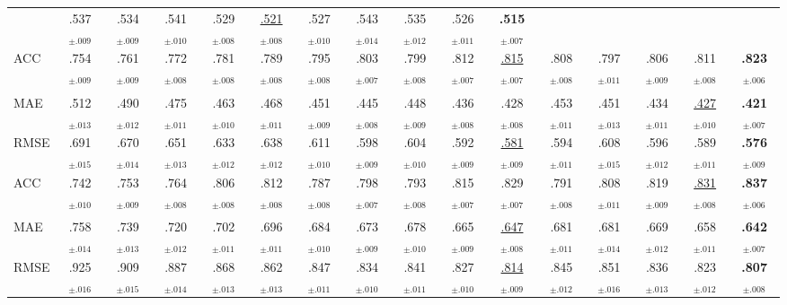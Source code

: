 \documentclass[10pt]{article}
\theoremstyle{plain}
\theoremstyle{definition}
\begin{document}
\begin{table}[ht!]
{\begin{tabular}{lccccc|cccccc|ccc|c}
     & .537$_{\pm.009}$ & .534$_{\pm.009}$ & .541$_{\pm.010}$ & .529$_{\pm.008}$ & \underline{.521}$_{\pm.008}$ & .527$_{\pm.010}$
     & .543$_{\pm.014}$ & .535$_{\pm.012}$ & .526$_{\pm.011}$ & \textbf{.515}$_{\pm.007}$ \\
ACC  & .754$_{\pm.009}$ & .761$_{\pm.009}$ & .772$_{\pm.008}$ & .781$_{\pm.008}$ & .789$_{\pm.008}$
     & .795$_{\pm.008}$ & .803$_{\pm.007}$ & .799$_{\pm.008}$ & .812$_{\pm.007}$ & \underline{.815}$_{\pm.007}$ & .808$_{\pm.008}$
     & .797$_{\pm.011}$ & .806$_{\pm.009}$ & .811$_{\pm.008}$ & \textbf{.823}$_{\pm.006}$ \\
\midrule
\rowcolor{gray!8}\multicolumn{16}{l}{\textbf{DBLP}} \\
MAE  & .512$_{\pm.013}$ & .490$_{\pm.012}$ & .475$_{\pm.011}$ & .463$_{\pm.010}$ & .468$_{\pm.011}$
     & .451$_{\pm.009}$ & .445$_{\pm.008}$ & .448$_{\pm.009}$ & .436$_{\pm.008}$ & .428$_{\pm.008}$ & .453$_{\pm.011}$
     & .451$_{\pm.013}$ & .434$_{\pm.011}$ & \underline{.427}$_{\pm.010}$ & \textbf{.421}$_{\pm.007}$ \\
RMSE & .691$_{\pm.015}$ & .670$_{\pm.014}$ & .651$_{\pm.013}$ & .633$_{\pm.012}$ & .638$_{\pm.012}$
     & .611$_{\pm.010}$ & .598$_{\pm.009}$ & .604$_{\pm.010}$ & .592$_{\pm.009}$ & \underline{.581}$_{\pm.009}$ & .594$_{\pm.011}$
     & .608$_{\pm.015}$ & .596$_{\pm.012}$ & .589$_{\pm.011}$ & \textbf{.576}$_{\pm.009}$ \\
ACC  & .742$_{\pm.010}$ & .753$_{\pm.009}$ & .764$_{\pm.008}$ & .806$_{\pm.008}$ & .812$_{\pm.008}$
     & .787$_{\pm.008}$ & .798$_{\pm.007}$ & .793$_{\pm.008}$ & .815$_{\pm.007}$ & .829$_{\pm.007}$ & .791$_{\pm.008}$
     & .808$_{\pm.011}$ & .819$_{\pm.009}$ & \underline{.831}$_{\pm.008}$ & \textbf{.837}$_{\pm.006}$ \\
\midrule
\rowcolor{gray!8}\multicolumn{16}{l}{\textbf{Yelp}} \\
MAE  & .758$_{\pm.014}$ & .739$_{\pm.013}$ & .720$_{\pm.012}$ & .702$_{\pm.011}$ & .696$_{\pm.011}$
     & .684$_{\pm.010}$ & .673$_{\pm.009}$ & .678$_{\pm.010}$ & .665$_{\pm.009}$ & \underline{.647}$_{\pm.008}$ & .681$_{\pm.011}$
     & .681$_{\pm.014}$ & .669$_{\pm.012}$ & .658$_{\pm.011}$ & \textbf{.642}$_{\pm.007}$ \\
RMSE & .925$_{\pm.016}$ & .909$_{\pm.015}$ & .887$_{\pm.014}$ & .868$_{\pm.013}$ & .862$_{\pm.013}$
     & .847$_{\pm.011}$ & .834$_{\pm.010}$ & .841$_{\pm.011}$ & .827$_{\pm.010}$ & \underline{.814}$_{\pm.009}$ & .845$_{\pm.012}$
     & .851$_{\pm.016}$ & .836$_{\pm.013}$ & .823$_{\pm.012}$ & \textbf{.807}$_{\pm.008}$ \\

\end{tabular}}
\end{table}
\end{document}

